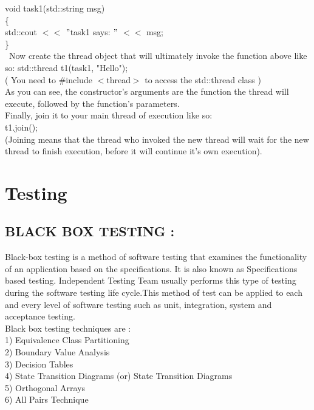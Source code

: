 \documentclass[a4paper,12pt]{article}
\begin{document}
{{		void task1(std::string msg)\\
		\{\ \\
			std::cout $<<$ $"$task1 says: $"$ $<<$ msg; \\
		\}\\\
		Now create the thread object that will ultimately invoke the function above like so:
		std::thread t1(task1, "Hello");\\
		( You need to \#include $<$thread$>$ to access the std::thread class )\\
		As you can see, the constructor's arguments are the function the thread will execute, followed by the function's parameters.\\
		Finally, join it to your main thread of execution like so:\\
		t1.join(); \\
		(Joining means that the thread who invoked the new thread will wait for the new thread to finish execution, before it will continue it's own execution).\\	
			
\section{Testing}
\subsection{BLACK BOX TESTING : }
		 Black-box testing is a method of software testing that examines the functionality of an application based on the specifications. It is also known as Specifications based testing. Independent Testing Team usually performs this type of testing during the software testing life cycle.This method of test can be applied to each and every level of software testing such as unit, integration, system and acceptance testing.\\
		 Black box testing techniques are :\\
1) Equivalence Class Partitioning\\
2) Boundary Value Analysis\\
3) Decision Tables\\
4) State Transition Diagrams (or) State Transition Diagrams\\
5) Orthogonal Arrays\\
6) All Pairs Technique\\

}}
\end{document}
